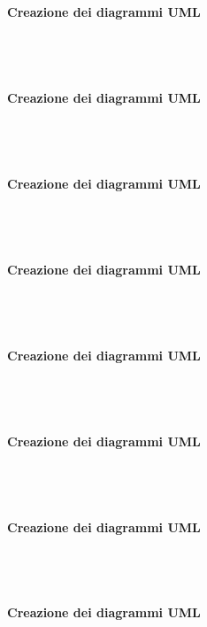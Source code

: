 \paragraph{Creazione dei diagrammi UML} \mbox{}\\ \mbox{}\\

\paragraph{Creazione dei diagrammi UML} \mbox{}\\ \mbox{}\\

\paragraph{Creazione dei diagrammi UML} \mbox{}\\ \mbox{}\\

\paragraph{Creazione dei diagrammi UML} \mbox{}\\ \mbox{}\\

\paragraph{Creazione dei diagrammi UML} \mbox{}\\ \mbox{}\\

\paragraph{Creazione dei diagrammi UML} \mbox{}\\ \mbox{}\\

\paragraph{Creazione dei diagrammi UML} \mbox{}\\ \mbox{}\\

\paragraph{Creazione dei diagrammi UML} \mbox{}\\ \mbox{}\\\\

